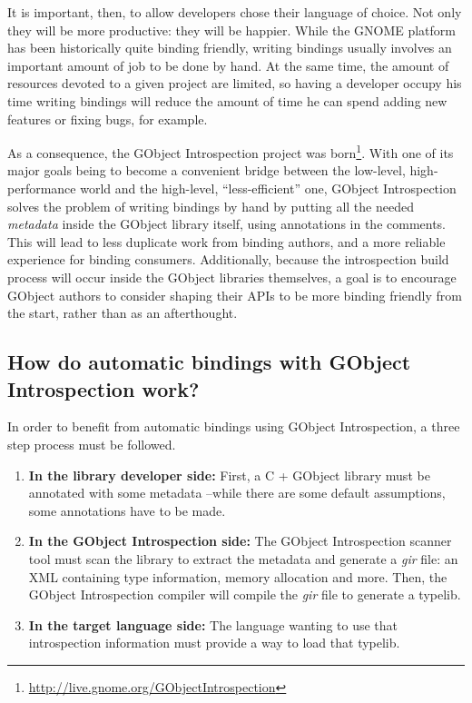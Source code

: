 It is important, then, to allow developers chose their language of choice. Not only
they will be more productive: they will be happier. While the GNOME platform has
been historically quite binding friendly, writing bindings usually involves an important
amount of job to be done by hand. At the same time, the amount of resources devoted
to a given project are limited, so having a developer occupy his time writing bindings
will reduce the amount of time he can spend adding new features or fixing bugs, for
example.

As a consequence, the GObject Introspection project was born\footnote{\url{http://live.gnome.org/GObjectIntrospection}}. With one of its major goals
being to become a convenient bridge between the low-level, high-performance world and
the high-level, ``less-efficient'' one, GObject Introspection solves the problem
of writing bindings by hand by putting all the needed {\it metadata} inside
the GObject library itself, using annotations in the comments. This will lead to less
duplicate work from binding authors, and a more reliable experience for binding consumers.
Additionally, because the introspection build process will occur inside the GObject libraries
themselves, a goal is to encourage GObject authors to consider shaping their APIs to be more
binding friendly from the start, rather than as an afterthought.

\subsection[How do automatic bindings work?]{How do automatic bindings with GObject Introspection work?}

In order to benefit from automatic bindings using GObject Introspection, a three step process must
be followed.
\begin{enumerate}
\item \textbf{In the library developer side:} First, a C + GObject library must be annotated
with some metadata --while there are some default assumptions, some annotations have to be made.

\item \textbf{In the GObject Introspection side:} The GObject Introspection scanner tool must
scan the library to extract the metadata and generate a {\it gir} file: an XML containing
type information, memory allocation and more. Then, the GObject Introspection compiler
will compile the {\it gir} file to generate a typelib.

\item \textbf{In the target language side:} The language wanting to use that introspection
information must provide a way to load that typelib.
\end{enumerate}

